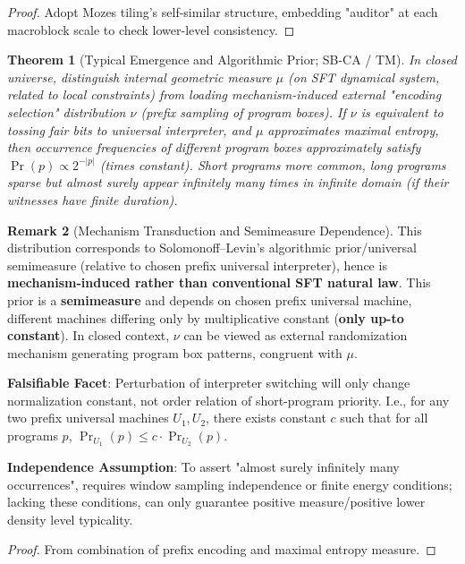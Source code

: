 \documentclass[12pt]{article}
\theoremstyle{plain}
\newtheorem{theorem}{Theorem}[section]
\theoremstyle{definition}
\newtheorem{remark}[theorem]{Remark}
\begin{document}
\begin{proof}
Adopt Mozes tiling's\cite{mozes1989} self-similar structure, embedding "auditor" at each macroblock scale to check lower-level consistency.
\end{proof}

\begin{theorem}[Typical Emergence and Algorithmic Prior; SB-CA / TM]
In closed universe, distinguish internal geometric measure $\mu$ (on SFT dynamical system, related to local constraints) from loading mechanism-induced external "encoding selection" distribution $\nu$ (prefix sampling of program boxes). If $\nu$ is equivalent to tossing fair bits to universal interpreter, and $\mu$ approximates maximal entropy, then occurrence frequencies of different program boxes approximately satisfy $\Pr(p) \propto 2^{-|p|}$ (times constant). Short programs more common, long programs sparse but almost surely appear infinitely many times in infinite domain (if their witnesses have finite duration).
\end{theorem}

\begin{remark}[Mechanism Transduction and Semimeasure Dependence]
This distribution corresponds to Solomonoff--Levin's\cite{solomonoff1964,levin1974} algorithmic prior/universal semimeasure (relative to chosen prefix universal interpreter), hence is \textbf{mechanism-induced rather than conventional SFT natural law}. This prior is a \textbf{semimeasure} and depends on chosen prefix universal machine, different machines differing only by multiplicative constant (\textbf{only up-to constant}). In closed context, $\nu$ can be viewed as external randomization mechanism generating program box patterns, congruent with $\mu$.

\textbf{Falsifiable Facet}: Perturbation of interpreter switching will only change normalization constant, not order relation of short-program priority. I.e., for any two prefix universal machines $U_1, U_2$, there exists constant $c$ such that for all programs $p$, $\Pr_{U_1}(p) \le c \cdot \Pr_{U_2}(p)$.

\textbf{Independence Assumption}: To assert "almost surely infinitely many occurrences", requires window sampling independence or finite energy conditions; lacking these conditions, can only guarantee positive measure/positive lower density level typicality.
\end{remark}

\begin{proof}
From combination of prefix encoding and maximal entropy measure.
\end{proof}
\end{document}
